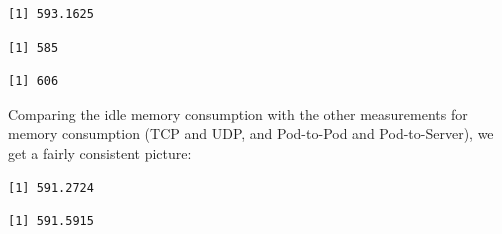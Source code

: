 \begin{verbatim}
[1] 593.1625
\end{verbatim}

\begin{Shaded}
\begin{Highlighting}[]
\SpecialCharTok{\$}
\end{Highlighting}
\end{Shaded}

\begin{verbatim}
[1] 585
\end{verbatim}

\begin{Shaded}
\begin{Highlighting}[]
\SpecialCharTok{\$}
\end{Highlighting}
\end{Shaded}

\begin{verbatim}
[1] 606
\end{verbatim}

Comparing the idle memory consumption with the other measurements for memory consumption (TCP and UDP, and Pod-to-Pod and Pod-to-Server), we get a fairly consistent picture:

\begin{Shaded}
\begin{Highlighting}[]
\SpecialCharTok{\$}
\end{Highlighting}
\end{Shaded}

\begin{verbatim}
[1] 591.2724
\end{verbatim}

\begin{Shaded}
\begin{Highlighting}[]
\SpecialCharTok{\$}
\end{Highlighting}
\end{Shaded}

\begin{verbatim}
[1] 591.5915
\end{verbatim}

\begin{Shaded}
\begin{Highlighting}[]
\SpecialCharTok{\$}
\end{Highlighting}
\end{Shaded}

